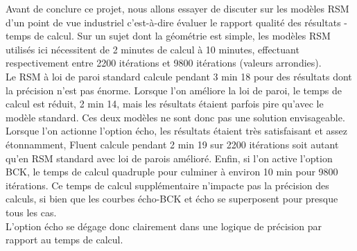 \documentclass[a4paper,10pt]{article}
\newcommand{\cad}{c'est-à-dire }
\newcommand{\brik}{\color{brick}}
\begin{document}
 Avant de conclure ce projet, nous allons essayer de discuter sur les modèles RSM d'un point de vue industriel \cad évaluer le rapport qualité des résultats - temps de calcul. Sur un sujet dont la géométrie est simple, les modèles RSM utilisés ici nécessitent de 2 minutes de calcul à 10 minutes, effectuant respectivement entre 2200 itérations et 9800 itérations (valeurs arrondies). \\
 Le RSM à loi de paroi standard calcule pendant 3 min 18 pour des résultats dont la précision n'est pas énorme. Lorsque l'on améliore la loi de paroi, le temps de calcul est réduit, 2 min 14, mais les résultats étaient parfois pire qu'avec le modèle standard. Ces deux modèles ne sont donc pas une solution envisageable. \\
 Lorsque l'on actionne l'option écho, les résultats étaient très satisfaisant et assez étonnamment, Fluent calcule pendant 2 min 19 sur 2200 itérations soit autant qu'en RSM standard avec loi de parois amélioré. Enfin, si l'on active l'option BCK, le temps de calcul quadruple pour culminer à environ 10 min pour 9800 itérations. Ce temps de calcul supplémentaire n'impacte pas la précision des calculs, si bien que les courbes écho-BCK et écho se superposent pour presque tous les cas.\\
L'option écho se dégage donc clairement dans une logique de précision par rapport au temps de calcul.\\
 
 \brik
\end{document}
